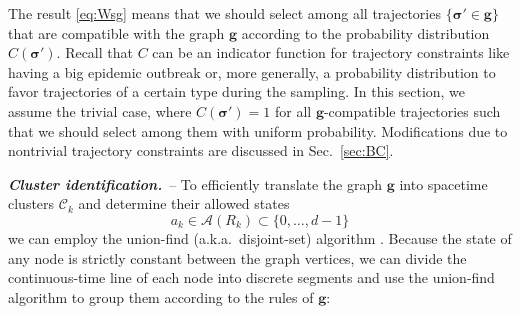 \documentclass[english,10pt,aps,pra,twocolumn,superscriptaddress,floatfix,fleqn]{revtex4-2}
\newcommand{\mc}[1]{\mathcal{#1}}
\renewcommand{\vec}[1]{{\boldsymbol{#1}}}
\newcommand{\A} {\mc{A}}
\newcommand{\C} {\mc{C}}
\newcommand{\vg}{\vec{g}}
\newcommand{\vs}{\vec{\sigma}}
\newcommand{\Emph}[1]{\emph{\textbf{#1}}}
\begin{document}
The result \eqref{eq:Wsg} means that we should select among all trajectories $\{\vs'\in\vg\}$ that are compatible with the graph $\vg$ according to the probability distribution $C(\vs')$. Recall that $C$ can be an indicator function for trajectory constraints like having a big epidemic outbreak or, more generally, a probability distribution to favor trajectories of a certain type during the sampling. In this section, we assume the trivial case, where $C(\vs')=1$ for all $\vg$-compatible trajectories such that we should select among them with uniform probability. Modifications due to nontrivial trajectory constraints are discussed in Sec.~\ref{sec:BC}.

\Emph{Cluster identification.}~-- 
To efficiently translate the graph $\vg$ into spacetime clusters $\C_k$ and determine their allowed states
\begin{equation}
	a_k\in\A(R_k)\subset\{0,\dotsc,d-1\}
\end{equation}
we can employ the union-find (a.k.a.\ disjoint-set) algorithm \cite{Galler1964-7,Tarjan1975-22,Tarjan1984-31,Brass2008}. Because the state of any node is strictly constant between the graph vertices, we can divide the continuous-time line of each node into discrete segments and use the union-find algorithm to group them according to the rules of $\vg$:
\end{document}
